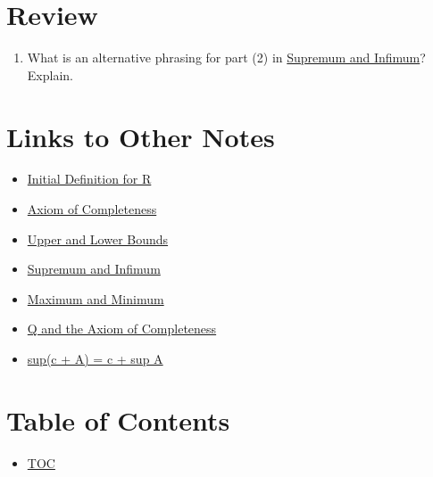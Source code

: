 \section*{Review}
\begin{enumerate}
  \item What is an alternative phrasing for part (2) in \hyperref[202501180743]{Supremum and Infimum}? Explain.
\end{enumerate}


\section*{Links to Other Notes}
\begin{itemize}
  \item \hyperref[202501180703]{Initial Definition for R}
  \item \hyperref[202501180727]{Axiom of Completeness}
  \item \hyperref[202501180734]{Upper and Lower Bounds}
  \item \hyperref[202501180743]{Supremum and Infimum}
  \item \hyperref[202501181241]{Maximum and Minimum}
  \item \hyperref[202501181257]{Q and the Axiom of Completeness}
  \item \hyperref[202501181310]{sup(c + A) = c + sup A}
\end{itemize}

\section*{Table of Contents}

\begin{itemize}
  \item \hyperref[toc]{TOC}
\end{itemize}

